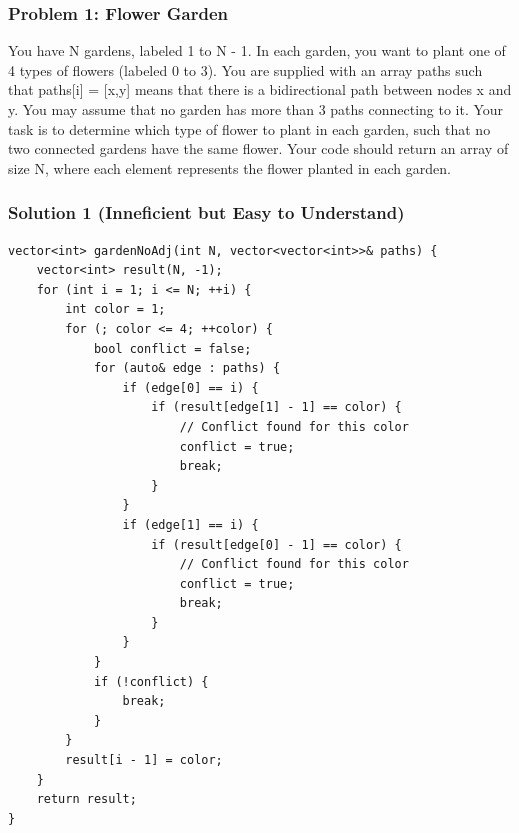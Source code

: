 \documentclass[aspectratio=169]{beamer}
\begin{document}
\begin{frame}
    \frametitle{Problem 1: Flower Garden}
    You have N gardens, labeled 1 to N - 1.  In each garden, you want to
    plant one of 4 types of flowers (labeled 0 to 3).  You are supplied
    with an array paths such that paths[i] = [x,y] means that there is a
    bidirectional path between nodes x and y. You may assume that no
    garden has more than 3 paths connecting to it.
    \vfill
    Your task is to determine which type of flower to plant in each
    garden, such that no two connected gardens have the same flower.
    Your code should return an array of size N, where each element
    represents the flower planted in each garden.
\end{frame}
\begin{frame}[fragile]
    \frametitle{Solution 1 (Inneficient but Easy to Understand)}
    \begin{lstlisting}[basicstyle=\tiny]
vector<int> gardenNoAdj(int N, vector<vector<int>>& paths) {
    vector<int> result(N, -1);
    for (int i = 1; i <= N; ++i) {
        int color = 1;
        for (; color <= 4; ++color) {
            bool conflict = false;
            for (auto& edge : paths) {
                if (edge[0] == i) {
                    if (result[edge[1] - 1] == color) {
                        // Conflict found for this color
                        conflict = true;
                        break;
                    }
                }
                if (edge[1] == i) {
                    if (result[edge[0] - 1] == color) {
                        // Conflict found for this color
                        conflict = true;
                        break;
                    }
                }
            }
            if (!conflict) {
                break;
            }
        }
        result[i - 1] = color;
    }
    return result;
}
    \end{lstlisting}

\end{frame}
\end{document}
